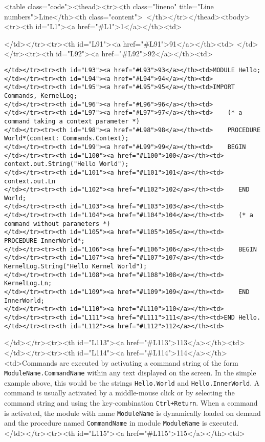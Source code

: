 <table class="code"><thead><tr><th class="lineno" title="Line numbers">Line</th><th class="content"> </th></tr></thead><tbody><tr><th id="L1"><a href="#L1">1</a></th><td>\documentclass[a4paper,11pt]{article}
\begin{document}
</td></tr><tr><th id="L91"><a href="#L91">91</a></th><td>
</td></tr><tr><th id="L92"><a href="#L92">92</a></th><td>\begin{lstlisting}[language=Oberon,frame=none,caption=A Simple Oberon Module]
</td></tr><tr><th id="L93"><a href="#L93">93</a></th><td>MODULE Hello;
</td></tr><tr><th id="L94"><a href="#L94">94</a></th><td>
</td></tr><tr><th id="L95"><a href="#L95">95</a></th><td>IMPORT Commands, KernelLog;
</td></tr><tr><th id="L96"><a href="#L96">96</a></th><td>
</td></tr><tr><th id="L97"><a href="#L97">97</a></th><td>    (* a command taking a context parameter *)
</td></tr><tr><th id="L98"><a href="#L98">98</a></th><td>    PROCEDURE World*(context: Commands.Context);
</td></tr><tr><th id="L99"><a href="#L99">99</a></th><td>    BEGIN
</td></tr><tr><th id="L100"><a href="#L100">100</a></th><td>        context.out.String("Hello World");
</td></tr><tr><th id="L101"><a href="#L101">101</a></th><td>        context.out.Ln
</td></tr><tr><th id="L102"><a href="#L102">102</a></th><td>    END World;
</td></tr><tr><th id="L103"><a href="#L103">103</a></th><td>
</td></tr><tr><th id="L104"><a href="#L104">104</a></th><td>    (* a command without parameters *)
</td></tr><tr><th id="L105"><a href="#L105">105</a></th><td>    PROCEDURE InnerWorld*;
</td></tr><tr><th id="L106"><a href="#L106">106</a></th><td>    BEGIN
</td></tr><tr><th id="L107"><a href="#L107">107</a></th><td>        KernelLog.String("Hello Kernel World");
</td></tr><tr><th id="L108"><a href="#L108">108</a></th><td>        KernelLog.Ln;
</td></tr><tr><th id="L109"><a href="#L109">109</a></th><td>    END InnerWorld;
</td></tr><tr><th id="L110"><a href="#L110">110</a></th><td>
</td></tr><tr><th id="L111"><a href="#L111">111</a></th><td>END Hello.
</td></tr><tr><th id="L112"><a href="#L112">112</a></th><td>\end{lstlisting}
</td></tr><tr><th id="L113"><a href="#L113">113</a></th><td>
</td></tr><tr><th id="L114"><a href="#L114">114</a></th><td>Commands are executed by activating a command string of the form \verb+ModuleName.CommandName+ within any text displayed on the screen. In the simple example above, this would be the strings \verb+Hello.World+ and \verb+Hello.InnerWorld+. A command is usually activated by a middle-mouse click or by selecting the command string and using the key-combination \verb|Ctrl+Return|. When a command is activated, the module with name \verb+ModuleName+ is dynamically loaded on demand and the procedure named \verb+CommandName+ in module \verb+ModuleName+ is executed.
</td></tr><tr><th id="L115"><a href="#L115">115</a></th><td>
\end{document}
